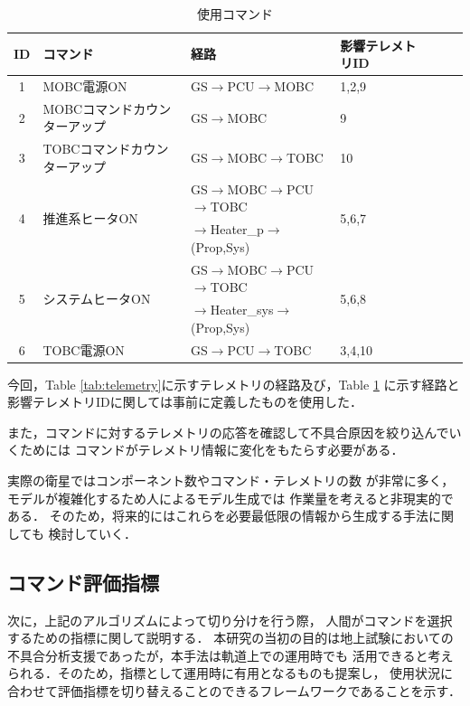 \documentclass[11pt]{article}
\begin{document}
\begin{table}[H]
   \centering
   \caption{使用コマンド}
   \label{tab:command}
      \begin{tabular}{clllccc} \hline
         ID&コマンド&経路&影響テレメトリID\\ \hline
         1&MOBC電源ON&GS$\rightarrow$PCU$\rightarrow$MOBC&1,2,9\\
         2&MOBCコマンドカウンターアップ&GS$\rightarrow$MOBC&9\\
         3&TOBCコマンドカウンターアップ&GS$\rightarrow$MOBC$\rightarrow$TOBC&10\\
         \multirow{2}{*}{4}&\multirow{2}{*}{推進系ヒータON}&GS$\rightarrow$MOBC$\rightarrow$PCU$\rightarrow$TOBC&\multirow{2}{*}{5,6,7}\\
         &&$\rightarrow$Heater\_p$\rightarrow$(Prop,Sys)&\\
         \multirow{2}{*}{5}&\multirow{2}{*}{システムヒータON}&GS$\rightarrow$MOBC$\rightarrow$PCU$\rightarrow$TOBC&\multirow{2}{*}{5,6,8}\\
         &&$\rightarrow$Heater\_sys$\rightarrow$(Prop,Sys)&\\
         6&TOBC電源ON&GS$\rightarrow$PCU$\rightarrow$TOBC&3,4,10\\ \hline
      \end{tabular}
\end{table}

今回，Table \ref{tab:telemetry}に示すテレメトリの経路及び，Table \ref{tab:command}
に示す経路と影響テレメトリIDに関しては事前に定義したものを使用した．

また，コマンドに対するテレメトリの応答を確認して不具合原因を絞り込んでいくためには
コマンドがテレメトリ情報に変化をもたらす必要がある．


実際の衛星ではコンポーネント数やコマンド・テレメトリの数
が非常に多く，モデルが複雑化するため人によるモデル生成では
作業量を考えると非現実的である．%
そのため，将来的にはこれらを必要最低限の情報から生成する手法に関しても
検討していく．


\subsection{コマンド評価指標}
次に，上記のアルゴリズムによって切り分けを行う際，
人間がコマンドを選択するための指標に関して説明する．
本研究の当初の目的は地上試験においての不具合分析支援であったが，本手法は軌道上での運用時でも
活用できると考えられる．そのため，指標として運用時に有用となるものも提案し，
使用状況に合わせて評価指標を切り替えることのできるフレームワークであることを示す．
\end{document}
